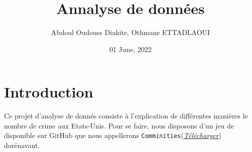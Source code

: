 \documentclass[
]{book}
\title{Annalyse de données}
\author{Abdoul Oudouss Diakite, Othmane ETTADLAOUI}
\date{01 June, 2022}
\begin{document}
\maketitle

{
\setcounter{tocdepth}{1}
\tableofcontents
}
\hypertarget{introduction}{%
\chapter*{Introduction}\label{introduction}}

Ce projet d'analyse de donnés consiste à l'explication de différentes manières le nombre de crime aux Etats-Unis. Pour se faire, nous disposons d'un jeu de disponible sur GitHub que nous appellerons \texttt{Comminities}(\href{https://github.com/AODiakite/Data-Analysis/blob/main/data/Communities.csv}{\emph{Télécharger}}) dorénavant.\\
\end{document}
